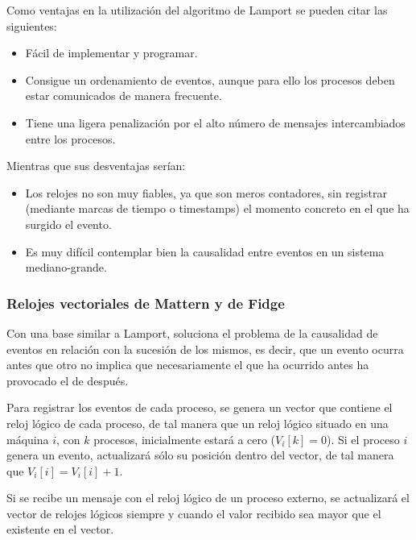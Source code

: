 \documentclass[a4paper, 11pt, titlepage]{article}
\begin{document}
            Como ventajas en la utilización del algoritmo de Lamport se pueden citar las siguientes:

            \begin{itemize}
                \item Fácil de implementar y programar. 
                \item Consigue un ordenamiento de eventos, aunque para ello los procesos deben estar 
                comunicados de manera frecuente.
                \item Tiene una ligera penalización por el alto número de mensajes intercambiados entre 
                los procesos.
            \end{itemize}

            Mientras que sus desventajas serían:

            \begin{itemize}
                \item Los relojes no son muy fiables, ya que son meros contadores, sin registrar (mediante 
                marcas de tiempo o timestamps) el momento concreto en el que ha surgido el evento.
                \item Es muy difícil contemplar bien la causalidad entre eventos en un sistema mediano-grande.
            \end{itemize}

        \subsubsection{Relojes vectoriales de Mattern y de Fidge}

            Con una base similar a Lamport, soluciona el problema de la causalidad de eventos en relación con 
            la sucesión de los mismos, es decir, que un evento ocurra antes que otro no implica que necesariamente 
            el que ha ocurrido antes ha provocado el de después.

            Para registrar los eventos de cada proceso, se genera un vector que contiene el reloj lógico 
            de cada proceso, de tal manera que un reloj lógico situado en una máquina $i$, con $k$ procesos, 
            inicialmente estará a cero ($V_i[k]=0$). Si el proceso $i$ genera un evento, actualizará sólo su 
            posición dentro del vector, de tal manera que $V_i[i] = V_i[i]+1$.

            Si se recibe un mensaje con el reloj lógico de un proceso externo, se actualizará el vector de 
            relojes lógicos siempre y cuando el valor recibido sea mayor que el existente en el vector.
\end{document}
